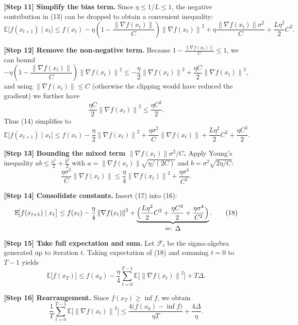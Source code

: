 \documentclass{article}
\newcommand{\E}{\mathbb{E}}
\newcommand{\norm}[1]{\left\lVert #1\right\rVert}
\begin{document}
\noindent\textbf{[Step 11] Simplify the bias term.} Since $\eta\le 1/L\le 1$, the negative contribution in (13) can be dropped to obtain a convenient inequality:
\[
\E\!\bigl[f(x_{t+1})\mid x_t\bigr]
\le f(x_t)-\eta\left(1-\frac{\norm{\nabla f(x_t)}}{C}\right)\norm{\nabla f(x_t)}^{2}
      +\eta\frac{\norm{\nabla f(x_t)}\sigma^{2}}{C}
      +\frac{L\eta^{2}}{2}C^{2}.
\tag{14}
\]

\noindent\textbf{[Step 12] Remove the non‑negative term.} Because $1-\frac{\norm{\nabla f(x_t)}}{C}\le 1$, we can bound
\[
-\eta\left(1-\frac{\norm{\nabla f(x_t)}}{C}\right)\norm{\nabla f(x_t)}^{2}
\le -\frac{\eta}{2}\norm{\nabla f(x_t)}^{2}
      +\frac{\eta C}{2}\norm{\nabla f(x_t)}^{2},
\]
and using $\norm{\nabla f(x_t)}\le C$ (otherwise the clipping would have reduced the gradient) we further have
\[
\frac{\eta C}{2}\norm{\nabla f(x_t)}^{2}\le \frac{\eta C^{3}}{2}.
\tag{15}
\]
Thus (14) simplifies to
\[
\E\!\bigl[f(x_{t+1})\mid x_t\bigr]
\le f(x_t)-\frac{\eta}{2}\norm{\nabla f(x_t)}^{2}
      +\frac{\eta\sigma^{2}}{C}\norm{\nabla f(x_t)}
      +\frac{L\eta^{2}}{2}C^{2}
      +\frac{\eta C^{3}}{2}.
\tag{16}
\]

\noindent\textbf{[Step 13] Bounding the mixed term $\norm{\nabla f(x_t)}\sigma^{2}/C$.} Apply Young’s inequality $ab\le \frac{a^{2}}{2}+ \frac{b^{2}}{2}$ with $a=\norm{\nabla f(x_t)}\sqrt{\eta/(2C)}$ and $b=\sigma^{2}\sqrt{2\eta/C}$:
\[
\frac{\eta\sigma^{2}}{C}\norm{\nabla f(x_t)}
\le \frac{\eta}{4}\norm{\nabla f(x_t)}^{2}
   +\frac{\eta\sigma^{4}}{C^{2}} .
\tag{17}
\]

\noindent\textbf{[Step 14] Consolidate constants.} Insert (17) into (16):
\[
\E\!\bigl[f(x_{t+1})\mid x_t\bigr]
\le f(x_t)-\frac{\eta}{4}\norm{\nabla f(x_t)}^{2}
      +\underbrace{\Bigl(\frac{L\eta^{2}}{2}C^{2}
                     +\frac{\eta C^{3}}{2}
                     +\frac{\eta\sigma^{4}}{C^{2}}\Bigr)}_{\displaystyle=:\,\Delta}.
\tag{18}
\]

\noindent\textbf{[Step 15] Take full expectation and sum.} Let $\mathcal{F}_t$ be the sigma‑algebra generated up to iteration $t$. Taking expectation of (18) and summing $t=0$ to $T-1$ yields
\[
\E\bigl[f(x_T)\bigr]
\le f(x_0)-\frac{\eta}{4}\sum_{t=0}^{T-1}\E\!\bigl[\norm{\nabla f(x_t)}^{2}\bigr]
     +T\Delta .
\tag{19}
\]

\noindent\textbf{[Step 16] Rearrangement.} Since $f(x_T)\ge \inf f$, we obtain
\[
\frac{1}{T}\sum_{t=0}^{T-1}\E\!\bigl[\norm{\nabla f(x_t)}^{2}\bigr]
\le \frac{4\bigl(f(x_0)-\inf f\bigr)}{\eta T}
     +\frac{4\Delta}{\eta}.
\tag{20}
\]
\end{document}
